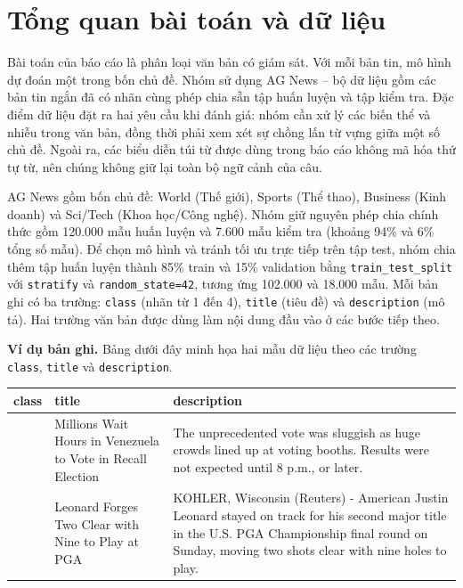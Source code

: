 \documentclass[12pt]{hcmut-report}
\newcommand{\firstparagraph}{\noindent\hspace*{2em}}
\begin{document}
\clearpage
\section{Tổng quan bài toán và dữ liệu}

\firstparagraph Bài toán của báo cáo là phân loại văn bản có giám sát. Với mỗi bản tin, mô hình dự đoán một trong bốn chủ đề. Nhóm sử dụng AG News -- bộ dữ liệu gồm các bản tin ngắn đã có nhãn cùng phép chia sẵn tập huấn luyện và tập kiểm tra. Đặc điểm dữ liệu đặt ra hai yêu cầu khi đánh giá: nhóm cần xử lý các biến thể và nhiễu trong văn bản, đồng thời phải xem xét sự chồng lấn từ vựng giữa một số chủ đề. Ngoài ra, các biểu diễn túi từ được dùng trong báo cáo không mã hóa thứ tự từ, nên chúng không giữ lại toàn bộ ngữ cảnh của câu.

AG News gồm bốn chủ đề: World (Thế giới), Sports (Thể thao), Business (Kinh doanh) và Sci/Tech (Khoa học/Công nghệ). Nhóm giữ nguyên phép chia chính thức gồm 120.000 mẫu huấn luyện và 7.600 mẫu kiểm tra (khoảng 94\% và 6\% tổng số mẫu). Để chọn mô hình và tránh tối ưu trực tiếp trên tập test, nhóm chia thêm tập huấn luyện thành 85\% train và 15\% validation bằng \texttt{train\_test\_split} với \texttt{stratify} và \texttt{random\_state=42}, tương ứng 102.000 và 18.000 mẫu. Mỗi bản ghi có ba trường: \texttt{class} (nhãn từ 1 đến 4), \texttt{title} (tiêu đề) và \texttt{description} (mô tả). Hai trường văn bản được dùng làm nội dung đầu vào ở các bước tiếp theo.

\noindent\textbf{Ví dụ bản ghi.} Bảng dưới đây minh họa hai mẫu dữ liệu theo các trường \texttt{class}, \texttt{title} và \texttt{description}.

\begingroup
\small
\renewcommand{\arraystretch}{1.35}
\setlength{\tabcolsep}{8pt}
\noindent\begin{tabularx}{\textwidth}{>{\centering\arraybackslash}p{1cm}>{\raggedright\arraybackslash}p{4.2cm}>{\raggedright\arraybackslash}X}
  \toprule
  \textbf{class} & \textbf{title} & \textbf{description} \\
  \midrule
  1 & Millions Wait Hours in Venezuela to Vote in Recall Election & The unprecedented vote was sluggish as huge crowds lined up at voting booths. Results were not expected until 8 p.m., or later. \\
  \addlinespace[5pt]
  2 & Leonard Forges Two Clear with Nine to Play at PGA & KOHLER, Wisconsin (Reuters) - American Justin Leonard stayed on track for his second major title in the U.S. PGA Championship final round on Sunday, moving two shots clear with nine holes to play. \\
  \bottomrule
\end{tabularx}
\endgroup
\end{document}
